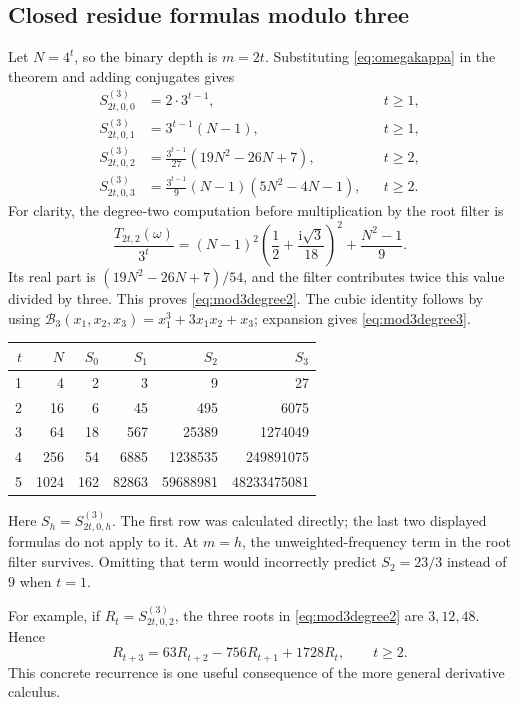 \documentclass[11pt,letterpaper]{article}
\numberwithin{equation}{section}
\theoremstyle{definition}
\theoremstyle{remark}
\newcommand{\ii}{\mathrm i}
\newcommand{\B}{\mathcal B}
\begin{document}
\subsection{Closed residue formulas modulo three}
Let \(N=4^t\), so the binary depth is \(m=2t\). Substituting \eqref{eq:omegakappa} in the theorem and adding conjugates gives
\begin{align}
 S^{(3)}_{2t,0,0}&=2\cdot3^{t-1},&&t\geq1,\\
 S^{(3)}_{2t,0,1}&=3^{t-1}(N-1),&&t\geq1,\\
 S^{(3)}_{2t,0,2}&=\frac{3^{t-1}}{27}(19N^2-26N+7),&&t\geq2,\label{eq:mod3degree2}\\
 S^{(3)}_{2t,0,3}&=\frac{3^{t-1}}9(N-1)(5N^2-4N-1),&&t\geq2.
 \label{eq:mod3degree3}
\end{align}
For clarity, the degree-two computation before multiplication by the root filter is
\[
 \frac{T_{2t,2}(\omega)}{3^t}
 =(N-1)^2\left(\frac12+\frac{\ii\sqrt3}{18}\right)^2
          +\frac{N^2-1}{9}.
\]
Its real part is \((19N^2-26N+7)/54\), and the filter contributes twice this value divided by three. This proves \eqref{eq:mod3degree2}. The cubic identity follows by using \(\B_3(x_1,x_2,x_3)=x_1^3+3x_1x_2+x_3\); expansion gives \eqref{eq:mod3degree3}.

\begin{center}
\begin{tabular}{rrrrrr}
\toprule
\(t\)&\(N\)&\(S_0\)&\(S_1\)&\(S_2\)&\(S_3\)\\
\midrule
1&4&2&3&9&27\\
2&16&6&45&495&6075\\
3&64&18&567&25389&1274049\\
4&256&54&6885&1238535&249891075\\
5&1024&162&82863&59688981&48233475081\\
\bottomrule
\end{tabular}
\end{center}
Here \(S_h=S^{(3)}_{2t,0,h}\). The first row was calculated directly; the last two displayed formulas do not apply to it. At \(m=h\), the unweighted-frequency term in the root filter survives. Omitting that term would incorrectly predict \(S_2=23/3\) instead of \(9\) when \(t=1\).

For example, if \(R_t=S^{(3)}_{2t,0,2}\), the three roots in \eqref{eq:mod3degree2} are \(3,12,48\). Hence
\begin{equation}
 R_{t+3}=63R_{t+2}-756R_{t+1}+1728R_t,\qquad t\geq2.
 \label{eq:explicitrecurrence}
\end{equation}
This concrete recurrence is one useful consequence of the more general derivative calculus.
\end{document}
